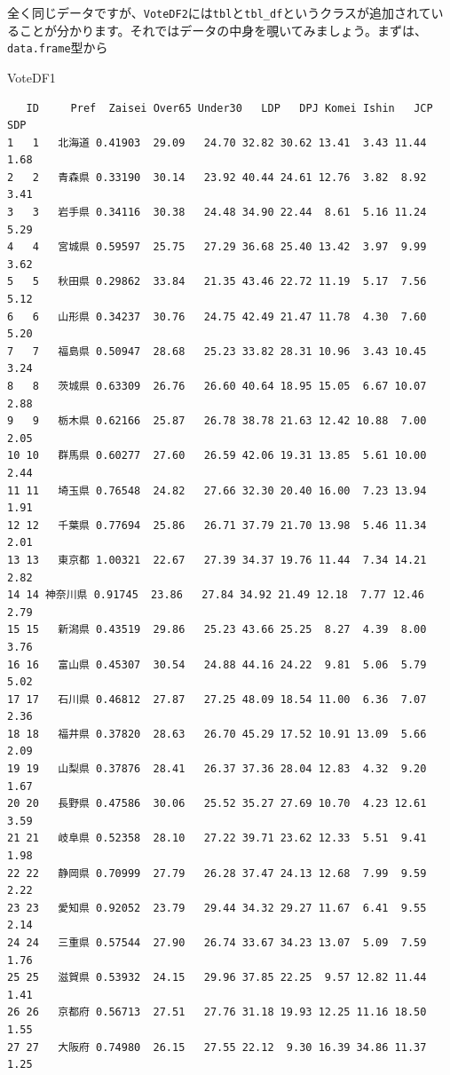 \documentclass[
  a4paper,
  pandoc,
  ja=standard,
  jafont=haranoaji]{bxjsbook}
\newenvironment{Shaded}{\begin{snugshade}}{\end{snugshade}}
\newcommand{\NormalTok}[1]{\textcolor[rgb]{0.00,0.48,0.65}{#1}}
\begin{document}
全く同じデータですが、\texttt{VoteDF2}には\texttt{tbl}と\texttt{tbl\_df}というクラスが追加されていることが分かります。それではデータの中身を覗いてみましょう。まずは、\texttt{data.frame}型から

\begin{Shaded}
\begin{Highlighting}[numbers=left,,]
\NormalTok{VoteDF1}
\end{Highlighting}
\end{Shaded}

\begin{verbatim}
   ID     Pref  Zaisei Over65 Under30   LDP   DPJ Komei Ishin   JCP   SDP
1   1   北海道 0.41903  29.09   24.70 32.82 30.62 13.41  3.43 11.44  1.68
2   2   青森県 0.33190  30.14   23.92 40.44 24.61 12.76  3.82  8.92  3.41
3   3   岩手県 0.34116  30.38   24.48 34.90 22.44  8.61  5.16 11.24  5.29
4   4   宮城県 0.59597  25.75   27.29 36.68 25.40 13.42  3.97  9.99  3.62
5   5   秋田県 0.29862  33.84   21.35 43.46 22.72 11.19  5.17  7.56  5.12
6   6   山形県 0.34237  30.76   24.75 42.49 21.47 11.78  4.30  7.60  5.20
7   7   福島県 0.50947  28.68   25.23 33.82 28.31 10.96  3.43 10.45  3.24
8   8   茨城県 0.63309  26.76   26.60 40.64 18.95 15.05  6.67 10.07  2.88
9   9   栃木県 0.62166  25.87   26.78 38.78 21.63 12.42 10.88  7.00  2.05
10 10   群馬県 0.60277  27.60   26.59 42.06 19.31 13.85  5.61 10.00  2.44
11 11   埼玉県 0.76548  24.82   27.66 32.30 20.40 16.00  7.23 13.94  1.91
12 12   千葉県 0.77694  25.86   26.71 37.79 21.70 13.98  5.46 11.34  2.01
13 13   東京都 1.00321  22.67   27.39 34.37 19.76 11.44  7.34 14.21  2.82
14 14 神奈川県 0.91745  23.86   27.84 34.92 21.49 12.18  7.77 12.46  2.79
15 15   新潟県 0.43519  29.86   25.23 43.66 25.25  8.27  4.39  8.00  3.76
16 16   富山県 0.45307  30.54   24.88 44.16 24.22  9.81  5.06  5.79  5.02
17 17   石川県 0.46812  27.87   27.25 48.09 18.54 11.00  6.36  7.07  2.36
18 18   福井県 0.37820  28.63   26.70 45.29 17.52 10.91 13.09  5.66  2.09
19 19   山梨県 0.37876  28.41   26.37 37.36 28.04 12.83  4.32  9.20  1.67
20 20   長野県 0.47586  30.06   25.52 35.27 27.69 10.70  4.23 12.61  3.59
21 21   岐阜県 0.52358  28.10   27.22 39.71 23.62 12.33  5.51  9.41  1.98
22 22   静岡県 0.70999  27.79   26.28 37.47 24.13 12.68  7.99  9.59  2.22
23 23   愛知県 0.92052  23.79   29.44 34.32 29.27 11.67  6.41  9.55  2.14
24 24   三重県 0.57544  27.90   26.74 33.67 34.23 13.07  5.09  7.59  1.76
25 25   滋賀県 0.53932  24.15   29.96 37.85 22.25  9.57 12.82 11.44  1.41
26 26   京都府 0.56713  27.51   27.76 31.18 19.93 12.25 11.16 18.50  1.55
27 27   大阪府 0.74980  26.15   27.55 22.12  9.30 16.39 34.86 11.37  1.25

\end{verbatim}
\end{document}
